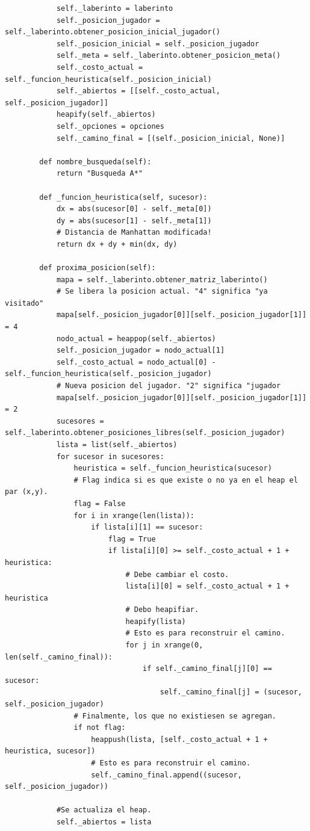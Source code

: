\documentclass[letter, titlepage, 10pt]{article}
\begin{document}
\begin{lstlisting}
            self._laberinto = laberinto
            self._posicion_jugador = self._laberinto.obtener_posicion_inicial_jugador()
            self._posicion_inicial = self._posicion_jugador
            self._meta = self._laberinto.obtener_posicion_meta()
            self._costo_actual = self._funcion_heuristica(self._posicion_inicial)
            self._abiertos = [[self._costo_actual, self._posicion_jugador]]
            heapify(self._abiertos)
            self._opciones = opciones
            self._camino_final = [(self._posicion_inicial, None)]
        
        def nombre_busqueda(self):
            return "Busqueda A*"
        
        def _funcion_heuristica(self, sucesor):
            dx = abs(sucesor[0] - self._meta[0])
            dy = abs(sucesor[1] - self._meta[1])
            # Distancia de Manhattan modificada!
            return dx + dy + min(dx, dy)
    
        def proxima_posicion(self):
            mapa = self._laberinto.obtener_matriz_laberinto()
            # Se libera la posicion actual. "4" significa "ya visitado"
            mapa[self._posicion_jugador[0]][self._posicion_jugador[1]] = 4
            nodo_actual = heappop(self._abiertos)
            self._posicion_jugador = nodo_actual[1]
            self._costo_actual = nodo_actual[0] - self._funcion_heuristica(self._posicion_jugador)
            # Nueva posicion del jugador. "2" significa "jugador
            mapa[self._posicion_jugador[0]][self._posicion_jugador[1]] = 2
            sucesores = self._laberinto.obtener_posiciones_libres(self._posicion_jugador)
            lista = list(self._abiertos)
            for sucesor in sucesores:
                heuristica = self._funcion_heuristica(sucesor)
                # Flag indica si es que existe o no ya en el heap el par (x,y).
                flag = False
                for i in xrange(len(lista)):
                    if lista[i][1] == sucesor:
                        flag = True
                        if lista[i][0] >= self._costo_actual + 1 + heuristica:
                            # Debe cambiar el costo.
                            lista[i][0] = self._costo_actual + 1 + heuristica
                            # Debo heapifiar.
                            heapify(lista)
                            # Esto es para reconstruir el camino.
                            for j in xrange(0, len(self._camino_final)):
                                if self._camino_final[j][0] == sucesor:
                                    self._camino_final[j] = (sucesor, self._posicion_jugador)
                # Finalmente, los que no existiesen se agregan.
                if not flag:
                    heappush(lista, [self._costo_actual + 1 + heuristica, sucesor])
                    # Esto es para reconstruir el camino.
                    self._camino_final.append((sucesor, self._posicion_jugador))
    
            #Se actualiza el heap.
            self._abiertos = lista
\end{lstlisting}
\end{document}
